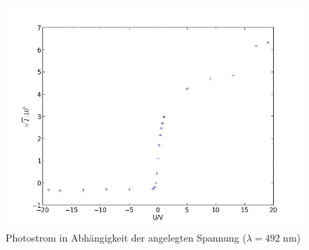 	\begin{figure}[h]
		\begin{center}
		\includegraphics[scale=0.7]{picagelb.jpg}
		\caption{Photostrom in Abhängigkeit der angelegten Spannung ($\lambda=492$ nm)}
		\label{picagelb}
		\end{center}	
	\end{figure}